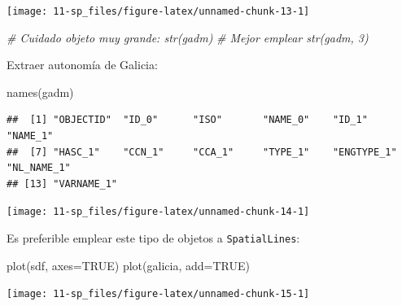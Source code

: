 \documentclass[
  spanish,
]{book}
\newenvironment{Shaded}{\begin{snugshade}}{\end{snugshade}}
\newcommand{\AttributeTok}[1]{\textcolor[rgb]{0.77,0.63,0.00}{#1}}
\newcommand{\CommentTok}[1]{\textcolor[rgb]{0.56,0.35,0.01}{\textit{#1}}}
\newcommand{\ConstantTok}[1]{\textcolor[rgb]{0.00,0.00,0.00}{#1}}
\newcommand{\FunctionTok}[1]{\textcolor[rgb]{0.00,0.00,0.00}{#1}}
\newcommand{\NormalTok}[1]{#1}
\newcommand{\OtherTok}[1]{\textcolor[rgb]{0.56,0.35,0.01}{#1}}
\newcommand{\SpecialCharTok}[1]{\textcolor[rgb]{0.00,0.00,0.00}{#1}}
\newcommand{\StringTok}[1]{\textcolor[rgb]{0.31,0.60,0.02}{#1}}
\theoremstyle{break}
\begin{document}
\begin{center}\texttt{[image: 11-sp\_files/figure-latex/unnamed-chunk-13-1]} \end{center}

\begin{Shaded}
\begin{Highlighting}[]
\CommentTok{\# Cuidado objeto muy grande: str(gadm)}
\CommentTok{\# Mejor emplear str(gadm, 3)}
\end{Highlighting}
\end{Shaded}

Extraer autonomía de Galicia:

\begin{Shaded}
\begin{Highlighting}[]
\FunctionTok{names}\NormalTok{(gadm)}
\end{Highlighting}
\end{Shaded}

\begin{verbatim}
##  [1] "OBJECTID"  "ID_0"      "ISO"       "NAME_0"    "ID_1"      "NAME_1"   
##  [7] "HASC_1"    "CCN_1"     "CCA_1"     "TYPE_1"    "ENGTYPE_1" "NL_NAME_1"
## [13] "VARNAME_1"
\end{verbatim}

\begin{Shaded}
\end{Shaded}

\begin{center}\texttt{[image: 11-sp\_files/figure-latex/unnamed-chunk-14-1]} \end{center}

Es preferible emplear este tipo de objetos a \texttt{SpatialLines}:

\begin{Shaded}
\begin{Highlighting}[]
\FunctionTok{plot}\NormalTok{(sdf, }\AttributeTok{axes=}\ConstantTok{TRUE}\NormalTok{)}
\FunctionTok{plot}\NormalTok{(galicia, }\AttributeTok{add=}\ConstantTok{TRUE}\NormalTok{)}
\end{Highlighting}
\end{Shaded}

\begin{center}\texttt{[image: 11-sp\_files/figure-latex/unnamed-chunk-15-1]} \end{center}
\end{document}
